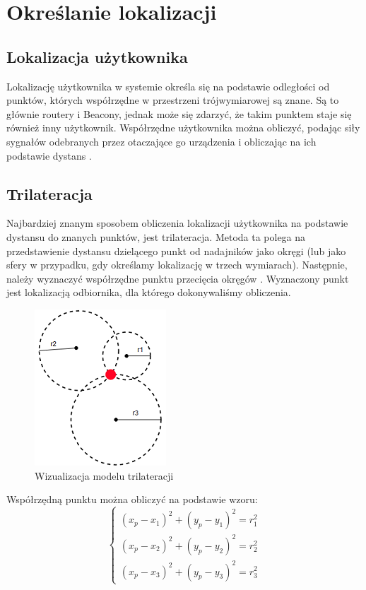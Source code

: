 \chapter{Określanie lokalizacji}
\label{cha:lokalizacja}
\section{Lokalizacja użytkownika}
Lokalizację użytkownika w systemie określa się na podstawie odległości od punktów, których współrzędne w przestrzeni trójwymiarowej są znane. Są to głównie routery i Beacony, jednak może się zdarzyć, że takim punktem staje się również inny użytkownik. Współrzędne użytkownika można obliczyć, podając siły sygnałów odebranych przez otaczające go urządzenia i obliczając na ich podstawie dystans \cite{RSC}.
\section{Trilateracja}
Najbardziej znanym sposobem obliczenia lokalizacji użytkownika na podstawie dystansu do znanych punktów, jest trilateracja. Metoda ta polega na przedstawienie dystansu dzielącego punkt od nadajników jako okręgi (lub jako sfery w przypadku, gdy określamy lokalizację w trzech wymiarach). Następnie, należy wyznaczyć współrzędne punktu przecięcia okręgów \cite{MS}. Wyznaczony punkt jest lokalizacją odbiornika, dla którego dokonywaliśmy obliczenia.
\begin{figure}[H]			
	\centering
	\caption{Wizualizacja modelu trilateracji}
	\includegraphics{trilateracja}
\end{figure}
Współrzędną punktu można obliczyć na podstawie wzoru:
\begin{equation}
\left\{
\begin{array}{l}
(x_p-x_1)^2 + (y_p - y_1)^2 = r_1^2\\
(x_p-x_2)^2 + (y_p - y_2)^2 = r_2^2\\
(x_p-x_3)^2 + (y_p - y_3)^2 = r_3^2
\end{array}
\right.
\end{equation}
